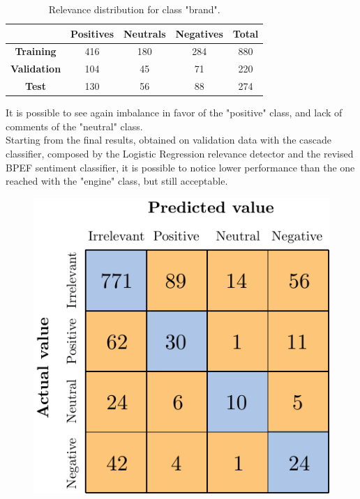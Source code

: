 \begin{table}[H]
	\centering
	\begin{tabular}{ | c  c  c c | c | } 
		\hline
		& \textbf{Positives} & \textbf{Neutrals} & \textbf{Negatives} & \textbf{Total} \\
		\hline
		\textbf{Training} & 416 & 180 & 284 & 880 \\ 
		\hline
		\textbf{Validation} & 104 & 45 & 71 & 220 \\ 
		\hline
		\textbf{Test} & 130 & 56 & 88 & 274 \\
		\hline
	\end{tabular}
	\caption{Relevance distribution for class "brand".}
	\label{table:snt-dist-brand}
\end{table}

It is possible to see again imbalance in favor of the "positive" class, and lack of comments of the "neutral" class.\\
Starting from the final results, obtained on validation data with the cascade classifier, composed by the Logistic Regression relevance detector and the revised BPEF sentiment classifier, it is possible to notice lower performance than the one reached with the "engine" class, but still acceptable.


\begin{figure}[H]
	\centering
	\includegraphics[scale=1]{figures/conf_matrices/ita_brand/ita_cascade_brand_bpef_val.pdf}
	\label{fig:ita_cascade_brand_bpef_val}
\end{figure}

